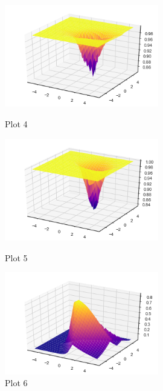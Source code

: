 \documentclass[a4paper]{article}
\theoremstyle{definition}
\newenvironment{soln}{
    \leavevmode\color{blue}\ignorespaces
}{}
\begin{document}
\begin{enumerate}
\begin{soln}
\begin{figure}[h!]
	        \centering
	        \includegraphics[width=0.6\textwidth]{Q2/Img4.png} 
	        \captionsetup{labelformat=empty}
	        \caption{Plot 4}


	        \centering
	        \includegraphics[width=0.6\textwidth]{Q2/Img5.png} 
	        \captionsetup{labelformat=empty}
	        \caption{Plot 5}


	        \centering
	        \includegraphics[width=0.6\textwidth]{Q2/Img6.png} 
	        \captionsetup{labelformat=empty}
	        \caption{Plot 6}
\end{figure}


\end{soln}


\clearpage


\end{enumerate}
\end{document}
